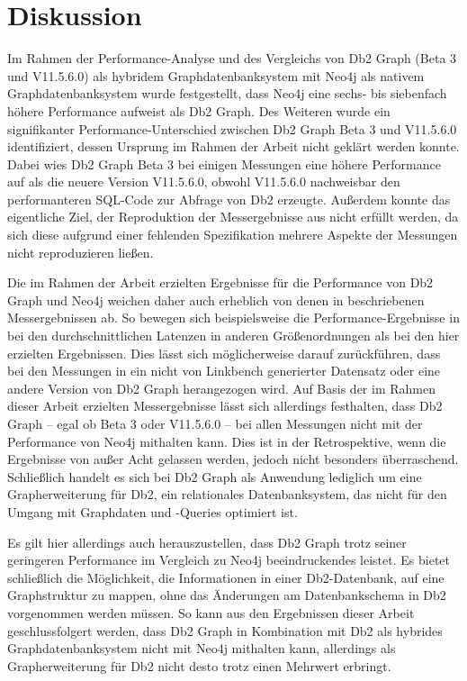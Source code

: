 \chapter{Diskussion}
\label{diskussion}
Im Rahmen der Performance-Analyse und des Vergleichs von Db2 Graph (Beta 3 und V11.5.6.0) als hybridem Graphdatenbanksystem mit Neo4j als nativem Graphdatenbanksystem wurde festgestellt, dass Neo4j eine sechs- bis siebenfach höhere Performance aufweist als Db2 Graph. Des Weiteren wurde ein signifikanter Performance-Unterschied zwischen Db2 Graph Beta 3 und V11.5.6.0 identifiziert, dessen Ursprung im Rahmen der Arbeit nicht geklärt werden konnte. Dabei wies Db2 Graph Beta 3 bei einigen Messungen eine höhere Performance auf als die neuere Version V11.5.6.0, obwohl V11.5.6.0 nachweisbar den performanteren SQL-Code zur Abfrage von Db2 erzeugte. Außerdem konnte das eigentliche Ziel, der Reproduktion der Messergebnisse aus \cite{sigmod_tian} nicht erfüllt werden, da sich diese aufgrund einer fehlenden Spezifikation mehrere Aspekte der Messungen nicht reproduzieren ließen. 

Die im Rahmen der Arbeit erzielten Ergebnisse für die Performance von Db2 Graph und Neo4j weichen daher auch erheblich von denen in \cite{sigmod_tian} beschriebenen Messergebnissen ab. So bewegen sich beispielsweise die Performance-Ergebnisse in \cite{sigmod_tian} bei den durchschnittlichen Latenzen in anderen Größenordnungen als bei den hier erzielten Ergebnissen. Dies lässt sich möglicherweise darauf zurückführen, dass bei den Messungen in \cite{sigmod_tian} ein nicht von Linkbench generierter Datensatz oder eine andere Version von Db2 Graph herangezogen wird. Auf Basis der im Rahmen dieser Arbeit erzielten Messergebnisse lässt sich allerdings festhalten, dass Db2 Graph -- egal ob Beta 3 oder V11.5.6.0 -- bei allen Messungen nicht mit der Performance von Neo4j mithalten kann. Dies ist in der Retrospektive, wenn die Ergebnisse von \cite{sigmod_tian} außer Acht gelassen werden, jedoch nicht besonders überraschend. Schließlich handelt es sich bei Db2 Graph als Anwendung lediglich um eine Grapherweiterung für Db2, ein relationales Datenbanksystem, das nicht für den Umgang mit Graphdaten und -Queries optimiert ist. 

Es gilt hier allerdings auch herauszustellen, dass Db2 Graph trotz seiner geringeren Performance im Vergleich zu Neo4j beeindruckendes leistet. Es bietet schließlich die Möglichkeit, die Informationen in einer Db2-Datenbank, auf eine Graphstruktur zu mappen, ohne das Änderungen am Datenbankschema in Db2 vorgenommen werden müssen. So kann aus den Ergebnissen dieser Arbeit geschlussfolgert werden, dass Db2 Graph in Kombination mit Db2 als hybrides Graphdatenbanksystem nicht mit Neo4j mithalten kann, allerdings als Grapherweiterung für Db2 nicht desto trotz einen Mehrwert erbringt. 

